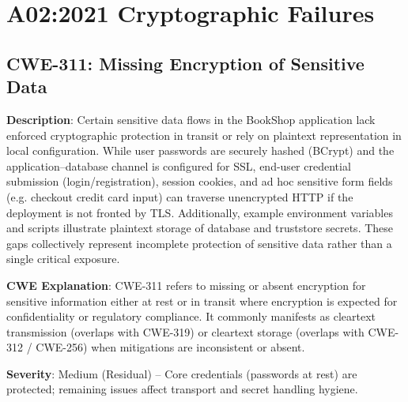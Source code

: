 \documentclass[]{UCD_CS_FYP_Report}
\begin{document}
\chapter{A02:2021 Cryptographic Failures}

\section{CWE-311: Missing Encryption of Sensitive Data}

	\textbf{Description}: Certain sensitive data flows in the BookShop application lack enforced cryptographic protection in transit or rely on plaintext representation in local configuration. While user passwords are securely hashed (BCrypt) and the application--database channel is configured for SSL, end-user credential submission (login/registration), session cookies, and ad hoc sensitive form fields (e.g. checkout credit card input) can traverse unencrypted HTTP if the deployment is not fronted by TLS. Additionally, example environment variables and scripts illustrate plaintext storage of database and truststore secrets. These gaps collectively represent incomplete protection of sensitive data rather than a single critical exposure.

	\textbf{CWE Explanation}: CWE-311 refers to missing or absent encryption for sensitive information either at rest or in transit where encryption is expected for confidentiality or regulatory compliance. It commonly manifests as cleartext transmission (overlaps with CWE-319) or cleartext storage (overlaps with CWE-312 / CWE-256) when mitigations are inconsistent or absent.

	\textbf{Severity}: Medium (Residual) -- Core credentials (passwords at rest) are protected; remaining issues affect transport and secret handling hygiene.
\end{document}
